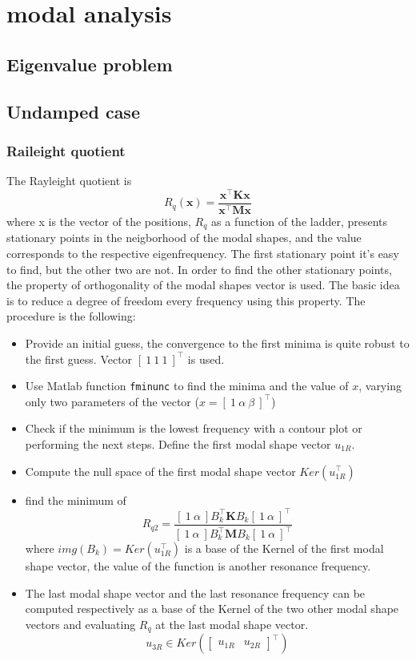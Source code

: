 \documentclass[twosided,a4paper]{article}           %
\newcommand{\tr}{^{{\bm \top}}}
\begin{document}
\section{modal analysis}
\subsection{Eigenvalue problem}
\label{sec:eigenvalueproblem}
\subsection{Undamped case}
\subsubsection{Raileight quotient}
	The Rayleight quotient is 
	\begin{equation}
		R_q(\bm x) = \dfrac{\bm x\tr \bm K \bm x}{\bm x\tr \bm M \bm x} 
	\end{equation}
	where x is the vector of the positions, $R_q$ as a function of the ladder, presents stationary points in the neigborhood of the modal shapes, and the value corresponds to the respective eigenfrequency. The first stationary point it's easy to find, but the other two are not. In order to find the other stationary points, the property of orthogonality of the modal shapes vector is used. The basic idea is to reduce a degree of freedom every frequency using this property. The procedure is the following:
	\begin{itemize}
		\item Provide an initial guess, the convergence to the first minima is quite robust to the first guess. Vector $[\ 1 \ 1 \ 1 \ ]\tr$ is used.
		\item Use Matlab function \texttt{fminunc} to find the minima and the value of $x$, varying only two parameters of the vector ($x = [\ 1 \ \alpha \  \beta\ ]\tr$) 
		\item Check if the minimum is the lowest frequency with a contour plot or performing the next steps. Define the first modal shape vector $u_{1R}$.  
		\item Compute the null space of the first modal shape vector $Ker(u_{1R}\tr) $
		\item find the minimum of
		\begin{equation}
			R_{q2} = \dfrac{[ \ 1 \ \alpha \ ] B_k\tr \bm K B_k [ \ 1 \ \alpha \ ]\tr}{[ \ 1 \ \alpha \ ] B_k\tr \bm M B_k [ \ 1 \ \alpha \ ]\tr}
		\label{eq:rq2}
		\end{equation}
		where $img(B_k) = Ker(u_{1R}\tr)$ is a base of the Kernel of the first modal shape vector, the value of the function is another resonance frequency.
		\item The last modal shape vector and the last resonance frequency can be computed respectively as a base of the Kernel of the two other modal shape vectors and evaluating $R_q$ at the last modal shape vector.
		\begin{equation}
			u_{3R} \in Ker(\left [
			\begin{array}{cc}
			u_{1R} &  u_{2R}
			\end{array} \right ]\tr)
		\end{equation}
	\end{itemize}
\end{document}

